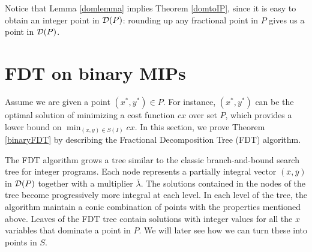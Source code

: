 	Notice that Lemma \ref{domlemma} implies Theorem \ref{domtoIP}, since it is easy to obtain an integer point in $\operatorname{\mathcal{D}}(P)$: rounding up any fractional point in $P$ gives us a point in $\operatorname{\mathcal{D}}(P)$.


\iffalse{
\begin{algorithm}[H]\label{FDTFull}
	\KwIn{$P= \{(x,y)\in \bbbr^{n\times p}: Ax+Gy\geq b\}$ and $S=\{(x,y)\in P: x\in \{0,1\}^n\}$ such that $g=\max_{c\in \bbbr^n_+ }\frac{\min_{(x,y)\in }cx}{\min_{(x,y)\in P}cx}$ is finite, $(x^*,y^*)\in P$}
	\KwOut{$(z^i,w^i)\in S$ and $\lambda_i\geq 0$ for $i=1,\ldots,k$ such that $\sum_{i=1}^{k}\lambda_i = 1$, and $\sum_{i=1}^{k}\lambda_iz^i\leq g^tx^*$ }
	$L^0\leftarrow [(x^*,y^*),1]$\\
	\For{$i=1$ \textbf{to} $t$}{
		$L'\leftarrow \emptyset$\\
		\For{$[(x,y),\lambda] \in L^i$}{
			Apply Lemma \ref{round-up} to obtain $[(\hat{x}^0,\hat{y}^0),\gamma_0]$ and $[(\hat{x}^1,\hat{y}^1),\gamma_1]$\\
			$L' \leftarrow L' \cup \{[(\hat{x}^0,\hat{y}^0),\gamma_0]\} \cup \{[(\hat{x}^1,\hat{y}^1),\gamma_1]\}$\\			
		}
		Apply Lemma \ref{prune} to $L'$ to obtain $L^{i+1}$. 
	}
	\For{$[(x,y),\lambda] \in L^t$}{
		Apply Algorithm \ref{domtoIP} to $(x,y)$ to obtain $(z,w)\in S$\\
		$F \leftarrow F \cup \{[(z,w),\lambda]\}$
	}
	\textbf{return} $F$
	\caption{Fractional Decomposition Tree Algorithm}
\end{algorithm}}\fi

\vspace*{-.1in}
\section{FDT on binary MIPs}
\label{binaryfdt}
\vspace*{-.1in}

Assume we are given a point $(x^*,y^*)\in P$. For instance, $(x^*,y^*)$ can be the optimal solution of minimizing a cost function $cx$ over set $P$, which provides a lower bound on $\min_{(x,y)\in S(I)} cx$.  In this section, we prove Theorem \ref{binaryFDT} by describing the Fractional Decomposition Tree (FDT) algorithm.
\iffalse{We also remark that if $g_I=1$, then the algorithm will give an exact decomposition of any feasible solution. }\fi


The FDT algorithm grows a tree similar to the classic branch-and-bound search tree for integer programs. Each node represents a partially integral vector $(\bar{x},\bar{y})$ in $\operatorname{\mathcal{D}}(P)$ together with a multiplier $\bar{\lambda}$. The solutions contained in the nodes of the tree become progressively more integral at each level. In each level of the tree, the algorithm maintain a conic combination of points with the properties mentioned above. Leaves of the FDT tree contain solutions with integer values for all the $x$ variables that dominate a point in $P$. We will later see how we can turn these into points in $S$. 


